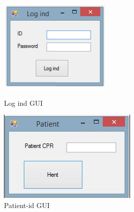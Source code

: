 \begin{figure}[htb]
  \begin{minipage}{0.35\textwidth}
    \centering
      \includegraphics[width=\textwidth]{login.PNG}
      \caption{Log ind GUI}
    \label{fig:figur1}
  \end{minipage}
  \hspace{0.1\textwidth}
  \begin{minipage}{0.40\textwidth}
    \centering
      \includegraphics[width=\textwidth]{patient}
      \caption{Patient-id GUI}
    \label{fig:figur2}
  \end{minipage}
\end{figure}

